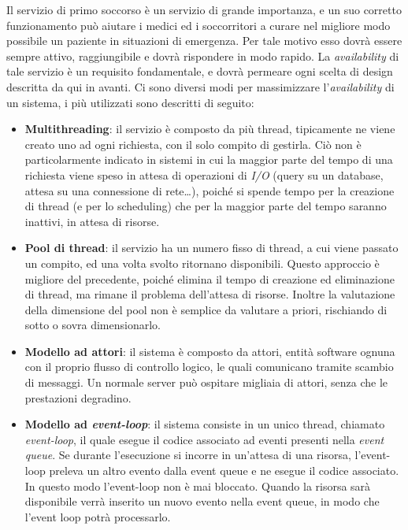 \documentclass[a4paper,12pt]{report}
\begin{document}
Il servizio di primo soccorso è un servizio di grande importanza, e un suo corretto funzionamento può aiutare i medici ed i soccorritori a curare nel migliore modo possibile un paziente in situazioni di emergenza. Per tale motivo esso dovrà essere sempre attivo, raggiungibile e dovrà rispondere in modo rapido. La \emph{availability} di tale servizio è un requisito fondamentale, e dovrà permeare ogni scelta di design descritta da qui in avanti. Ci sono diversi modi per massimizzare l'\emph{availability} di un sistema, i più utilizzati sono descritti di seguito: 
\begin{itemize}
	\item \textbf{Multithreading}: il servizio è composto da più thread, tipicamente ne viene creato uno ad ogni richiesta, con il solo compito di gestirla. Ciò non è particolarmente indicato in sistemi in cui la maggior parte del tempo di una richiesta viene speso in attesa di operazioni di \emph{I/O} (query su un database, attesa su una connessione di rete\dots), poiché si spende tempo per la creazione di thread (e per lo scheduling) che per la maggior parte del tempo saranno inattivi, in attesa di risorse.
	\item \textbf{Pool di thread}: il servizio ha un numero fisso di thread, a cui viene passato un compito, ed una volta svolto ritornano disponibili. Questo approccio è migliore del precedente, poiché elimina il tempo di creazione ed eliminazione di thread, ma rimane il problema dell'attesa di risorse. Inoltre la valutazione della dimensione del pool non è semplice da valutare a priori, rischiando di sotto o sovra dimensionarlo.
	\item \textbf{Modello ad attori}: il sistema è composto da attori, entità software ognuna con il proprio flusso di controllo logico, le quali comunicano tramite scambio di messaggi. Un normale server può ospitare migliaia di attori, senza che le prestazioni degradino. 
	\item \textbf{Modello ad \emph{event-loop}}: il sistema consiste in un unico thread, chiamato \emph{event-loop}, il quale esegue il codice associato ad eventi presenti nella \emph{event queue}. Se durante l'esecuzione si incorre in un'attesa di una risorsa, l'event-loop preleva un altro evento dalla event queue e ne esegue il codice associato. In questo modo l'event-loop non è mai bloccato. Quando la risorsa sarà disponibile verrà inserito un nuovo evento nella event queue, in modo che l'event loop potrà processarlo. 
\end{itemize}
\end{document}
